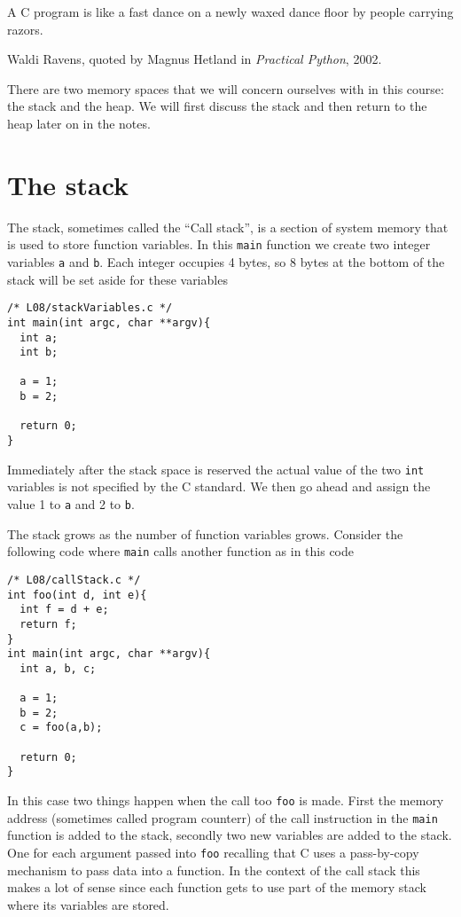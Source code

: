 
\epigraph{A C program is like a fast dance on a newly waxed dance floor by people carrying razors.}{
Waldi Ravens, quoted by Magnus  Hetland in \emph{Practical Python}, 2002.}

\minitoc

There are two memory spaces that we will concern ourselves with in this course: the stack and the heap. We will first discuss the stack and then return to the heap later on in the notes.

\section{The stack}

The stack, sometimes called the ``Call stack'', is a section of system memory that is used to store function variables. In this \texttt{main} function we create two integer variables \texttt{a} and \texttt{b}. Each integer occupies 4 bytes, so 8 bytes at the bottom of the stack will be set aside for these variables
\begin{verbatim}
/* L08/stackVariables.c */
int main(int argc, char **argv){
  int a;
  int b;
  
  a = 1;
  b = 2;
  
  return 0;
}
\end{verbatim}
Immediately after the stack space is reserved the actual value of the two \texttt{int} variables is not specified by the C standard. We then go ahead and assign the value 1 to \texttt{a} and 2 to \texttt{b}.

The stack grows as the number of function variables grows. Consider the following code where \texttt{main} calls another function as in this code

\begin{verbatim}
/* L08/callStack.c */
int foo(int d, int e){
  int f = d + e;
  return f;
}
int main(int argc, char **argv){
  int a, b, c;
    
  a = 1;
  b = 2;
  c = foo(a,b);
  
  return 0;
}
\end{verbatim}

In this case two things happen when the call too \texttt{foo} is made. First the memory address (sometimes called program counterr) of the call instruction in the \texttt{main} function is added to the stack, secondly two new variables are added to the stack. One for each argument passed into \texttt{foo} recalling that C uses a pass-by-copy mechanism to pass data into a function. In the context of the call stack this makes a lot of sense since each function gets to use part of the memory stack where its variables are stored. 

